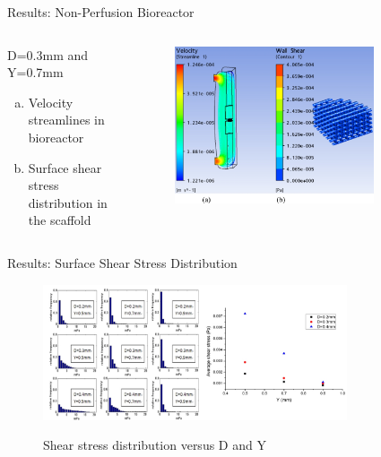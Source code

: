\documentclass[11pt,t]{beamer}
\begin{document}
\begin{frame}[fragile]{Results: Non-Perfusion Bioreactor}  

	\begin{columns}[t]
		\begin{column}{.40\textwidth}
		D=0.3mm and Y=0.7mm
		\begin{enumerate}[a)]
		\item
		Velocity streamlines in bioreactor
		\item
		Surface shear stress distribution in the scaffold
		\end{enumerate}
	
 
		\end{column}
		\begin{column}{.60\textwidth}
			\vspace{-15pt}
			\begin{figure}
			\centering
			\includegraphics[width=0.8\textwidth]{flow_nonperf}
			
			\end{figure}
		\end{column}
	\end{columns}	
		
\end{frame}


\begin{frame}[fragile]{Results: Surface Shear Stress Distribution}  

			\begin{figure}
			\centering
			\includegraphics[width=0.8\textwidth]{flow_shear1}
			
			\vspace{5pt}
			\footnotesize Shear stress distribution versus D and Y
			\end{figure}

\end{frame}
\end{document}
